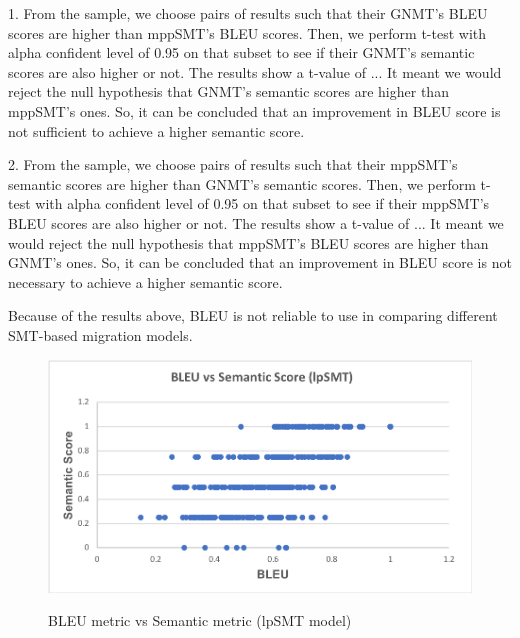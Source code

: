 1. From the sample, we choose pairs of results such that their GNMT's BLEU scores are higher than mppSMT's BLEU scores. Then, we perform t-test with alpha confident level of 0.95 on that subset to see if their GNMT's semantic scores are also higher or not. The results show a t-value of ... It meant we would reject the null hypothesis that GNMT's semantic scores are higher than mppSMT's ones. So, it can be concluded that an improvement in BLEU score is not sufficient to achieve a higher semantic score. 

2.  From the sample, we choose pairs of results such that their mppSMT's semantic scores are higher than GNMT's semantic scores. Then, we perform t-test with alpha confident level of 0.95 on that subset to see if their mppSMT's BLEU scores are also higher or not. The results show a t-value of ... It meant we would reject the null hypothesis that mppSMT's BLEU scores are higher than GNMT's ones. So, it can be concluded that an improvement in BLEU score is not necessary to achieve a higher semantic score. 

Because of the results above, BLEU is not reliable to use in comparing different SMT-based migration models. 

\begin{figure}
\caption{BLEU metric vs Semantic metric (lpSMT model)}
\centering
\includegraphics[scale=0.5]{img/bleuvssemantic_lpSMT.png}
\label{fig:BleuSemlpSMT}
\end{figure}

